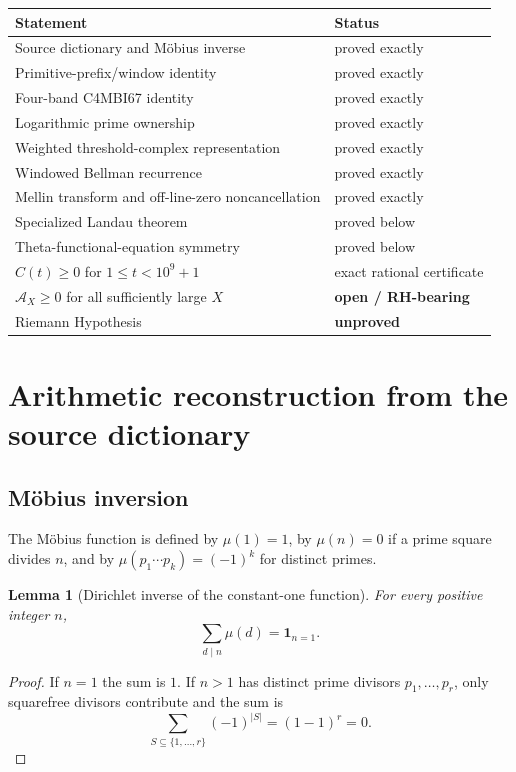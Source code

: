 \documentclass[11pt]{article}
\newtheorem{lemma}[theorem]{Lemma}
\newcommand{\1}{\mathbf 1}
\newcommand{\A}{\mathcal A}
\begin{document}
\begin{longtable}{@{}p{}p{}@{}}
\toprule
Statement & Status\\
\midrule
Source dictionary and Möbius inverse & proved exactly\\
Primitive-prefix/window identity & proved exactly\\
Four-band C4MBI67 identity & proved exactly\\
Logarithmic prime ownership & proved exactly\\
Weighted threshold-complex representation & proved exactly\\
Windowed Bellman recurrence & proved exactly\\
Mellin transform and off-line-zero noncancellation & proved exactly\\
Specialized Landau theorem & proved below\\
Theta-functional-equation symmetry & proved below\\
$C(t)\ge0$ for $1\le t<10^9+1$ & exact rational certificate\\
$\A_X\ge0$ for all sufficiently large $X$ & \textbf{open / RH-bearing}\\
Riemann Hypothesis & \textbf{unproved}\\
\bottomrule
\end{longtable}

\section{Arithmetic reconstruction from the source dictionary}

\subsection{Möbius inversion}

The Möbius function is defined by $\mu(1)=1$, by $\mu(n)=0$ if a prime square
divides $n$, and by $\mu(p_1\cdots p_k)=(-1)^k$ for distinct primes.

\begin{lemma}[Dirichlet inverse of the constant-one function]
For every positive integer $n$,
\[
 \sum_{d\mid n}\mu(d)=\1_{n=1}.
\]
\end{lemma}
\begin{proof}
If $n=1$ the sum is $1$.  If $n>1$ has distinct prime divisors
$p_1,\ldots,p_r$, only squarefree divisors contribute and the sum is
\[
 \sum_{S\subseteq\{1,\ldots,r\}}(-1)^{|S|}=(1-1)^r=0.
\]
\end{proof}
\end{document}
